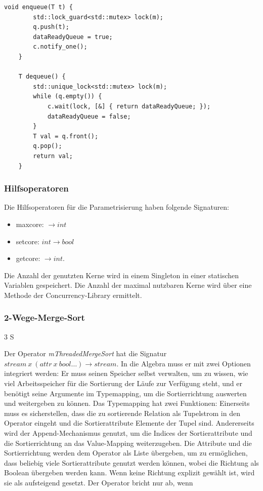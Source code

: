 \documentclass[a4paper,12pt,twoside]{article}
\newcommand{\Fb}[1]{\textit{#1}} %
\begin{document}
\begin{minipage}{\linewidth}
	\begin{lstlisting}[caption={Enqueue und Dequeue-Methode der threadsichere Warteschlange}, label=list:queue]
	void enqueue(T t) {
		std::lock_guard<std::mutex> lock(m);
		q.push(t);
		dataReadyQueue = true;
		c.notify_one();
	}
	
	T dequeue() {
		std::unique_lock<std::mutex> lock(m);
		while (q.empty()) {
			c.wait(lock, [&] { return dataReadyQueue; });
			dataReadyQueue = false;
		}
		T val = q.front();
		q.pop();
		return val;
	}
	\end{lstlisting}
\end{minipage}

\subsubsection{Hilfsoperatoren}

Die Hilfsoperatoren für die Parametrisierung haben folgende Signaturen:

\begin{itemize}
	\item maxcore: $\longrightarrow int$
	\item setcore: $int \longrightarrow bool$
	\item getcore: $\longrightarrow int$.
\end{itemize}

Die Anzahl der genutzten Kerne wird in einem Singleton in einer statischen Variablen gespeichert. Die Anzahl der maximal nutzbaren Kerne wird über eine Methode der Concurrency-Library ermittelt.

\subsubsection{2-Wege-Merge-Sort} 3 S

Der Operator \Fb{mThreadedMergeSort} hat die Signatur $stream~x~(attr~x~bool \ldots) \longrightarrow stream$. In die Algebra muss er mit zwei Optionen integriert werden: Er muss seinen Speicher selbst verwalten, um zu wissen, wie viel Arbeitsspeicher für die Sortierung der Läufe zur Verfügung steht, und er benötigt seine Argumente im Typemapping, um die Sortierrichtung auswerten und weitergeben zu können. Das Typemapping hat zwei Funktionen: Einerseits muss es sicherstellen, dass die zu sortierende Relation als Tupelstrom in den Operator eingeht und die Sortierattribute Elemente der Tupel sind. Andererseits wird der Append-Mechanismus genutzt, um die Indices der Sortierattribute und die Sortierrichtung an das Value-Mapping weiterzugeben. Die Attribute und die Sortierrichtung werden dem Operator als Liste übergeben, um zu ermöglichen, dass beliebig viele Sortierattribute genutzt werden können, wobei die Richtung als Boolean übergeben werden kann. Wenn keine Richtung explizit gewählt ist, wird sie als aufsteigend gesetzt. Der Operator bricht nur ab, wenn 
\end{document}
